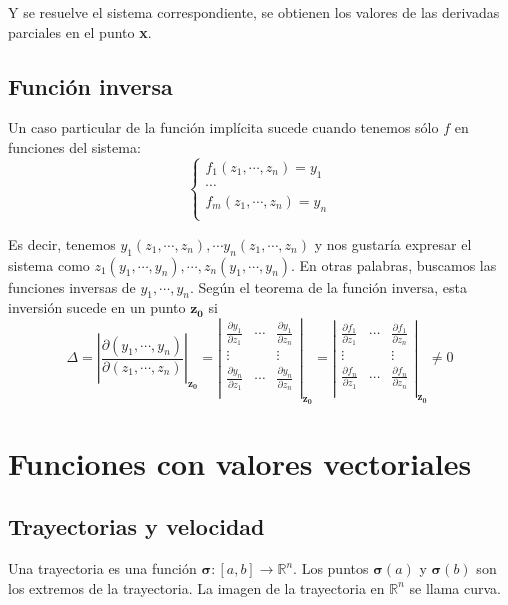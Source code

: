 \documentclass[a4paper]{article}
\begin{document}
Y se resuelve el sistema correspondiente, se obtienen los valores de las derivadas parciales en el punto \textbf{x}.
\subsection{Función inversa}
Un caso particular de la función implícita sucede cuando tenemos sólo $f$ en funciones del sistema:
\[\begin{cases}
f_1(z_1, \cdots, z_n) = y_1\\
\cdots \\
f_m(z_1, \cdots, z_n) = y_n\\
\end{cases}  \]

Es decir, tenemos $y_1(z_1, \cdots, z_n), \cdots y_n(z_1, \cdots, z_n)$ y nos gustaría expresar el sistema como 
$z_1(y_1, \cdots, y_n), \cdots, z_n(y_1, \cdots, y_n)$. En otras palabras, buscamos las funciones inversas de $y_1, \cdots, y_n$. Según el teorema de la función inversa, esta inversión sucede en un punto $\textbf{z}_\textbf{0}$ si
\[ \Delta = \left| \frac{\partial(y_1, \cdots, y_n)}{\partial(z_1,\cdots, z_n)} \right|_{\textbf{z}_\textbf{0}} =  
\left|\begin{matrix}
\frac{\partial y_1}{\partial z_1} & \cdots & \frac{\partial y_1}{\partial z_n}\\
\vdots & & \vdots \\
\frac{\partial y_n}{\partial z_1} & \cdots & \frac{\partial y_n}{\partial z_n}\\
\end{matrix} \right|_{\textbf{z}_\textbf{0}} = 
\left|\begin{matrix}
\frac{\partial f_1}{\partial z_1} & \cdots & \frac{\partial f_1}{\partial z_n}\\
\vdots & & \vdots \\
\frac{\partial f_n}{\partial z_1} & \cdots & \frac{\partial f_n}{\partial z_n}\\
\end{matrix} \right|_{\textbf{z}_\textbf{0}} \neq 0 \]

\section{Funciones con valores vectoriales}
\subsection{Trayectorias y velocidad}
Una trayectoria es una función $\boldsymbol{\sigma}:[a,b] \rightarrow \mathbb{R}^n$. Los puntos $\boldsymbol{\sigma}(a)$ y $\boldsymbol{\sigma}(b)$ son los extremos de la trayectoria. La imagen de la trayectoria en $\mathbb{R}^n$ se llama curva. 
\end{document}
